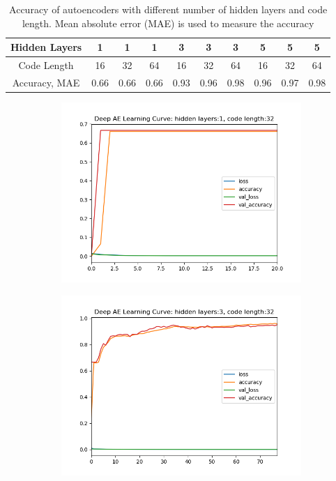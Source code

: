 \documentclass{article}
\begin{document}
\begin{table} [h!]
\centering
\begin{tabular}{c|c|c|c|c|c|c|c|c|c}
	Hidden Layers & 1 & 1 & 1 & 3 & 3 & 3 & 5 & 5 & 5 \\
	\hline
	Code Length & 16 & 32 & 64 & 16 & 32 & 64 & 16 & 32 & 64 \\
	\hline
	Accuracy, MAE & 0.66 & 0.66 & 0.66 & 0.93 & 0.96 & 0.98 & 0.96 & 0.97 & 0.98
\end{tabular}
\caption{Accuracy of autoencoders with different number of hidden layers and code length. Mean absolute error (MAE) is used to measure the accuracy}
\label{table:ae}
\end{table}

\begin{figure}[h]
\begin{subfigure}{.5\textwidth}
\includegraphics[width=.75\linewidth]{LearingCurve-HL1-CL32.png}
\end{subfigure}
\begin{subfigure}{.5\textwidth}
\includegraphics[width=.75\linewidth]{LearingCurve-HL3-CL32.png}
\end{subfigure}

\end{figure}
\end{document}
